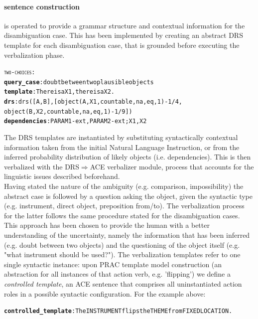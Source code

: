 \documentclass[oribibl]{llncs}
\begin{document}
\paragraph{sentence construction} is operated to provide a grammar structure and contextual information for the disambiguation case. This has been implemented by creating an 
abstract DRS template for each disambiguation case, that is grounded 
before executing the verbalization phase. 
\begin{alltt}
{\large \textsc{two-choices}}:
    \textbf{query_case}: doubt between two plausible objects
    \textbf{template}: There is a X1, there is a X2.
    \textbf{drs}: drs([A,B],[object(A,X1,countable,na,eq,1)-1/4,
    object(B,X2,countable,na,eq,1)-1/9])
    \textbf{dependencies}: PARAM1-ext, PARAM2-ext; X1, X2
\end{alltt} 

The DRS templates are instantiated by substituting 
syntactically contextual information taken from the initial Natural 
Language Instruction, or from the inferred probability distribution 
of likely objects (i.e. dependencies). This is then verbalized with 
the DRS$\Rightarrow$ACE verbalizer module, process that accounts for 
the linguistic issues described beforehand.\\ Having stated the 
nature of the ambiguity (e.g. comparison, impossibility) the 
abstract case is followed by a question asking the object, 
given the syntactic type (e.g. instrument, direct object, 
preposition from/to). The verbalization process for the latter 
follows the same procedure stated for the disambiguation cases. \\ 
This approach has been chosen to provide the human with a better
 understanding of the uncertainty, namely the information that has
  been inferred (e.g. doubt between two objects) and the questioning 
  of the object itself (e.g. "what instrument should be used?"). 
  The verbalization templates refer to one single syntactic instance: upon PRAC template 
model construction (an abstraction for all instances of that action 
verb, e.g. 'flipping') we define a \textit{controlled template}, an 
ACE sentence that comprises all uninstantiated action roles in a 
possible syntactic configuration. For the example above: 

{\small 
\begin{alltt} \textbf{controlled_template}: The INSTRUMENT flips the THEME from FIXEDLOCATION. \end{alltt} }
\end{document}
